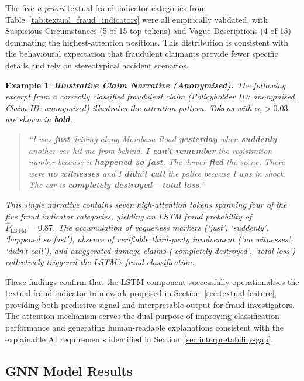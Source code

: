 \documentclass[12pt,a4paper,oneside]{report}
\newtheorem{example}{Example}[section]
\numberwithin{equation}{chapter}
\begin{document}
 The five \textit{a priori} textual fraud indicator categories from
Table~\ref{tab:textual_fraud_indicators} were all empirically validated, with Suspicious
Circumstances (5 of 15 top tokens) and Vague Descriptions (4 of 15) dominating the
highest-attention positions. This distribution is consistent with the behavioural expectation
that fraudulent claimants provide fewer specific details and rely on stereotypical accident
scenarios.

\begin{example}
\label{ex:fraud-narrative}
\textbf{Illustrative Claim Narrative (Anonymised).} The following excerpt from a correctly
classified fraudulent claim (\textit{Policyholder ID: anonymised, Claim ID: anonymised})
illustrates the attention pattern. Tokens with $\alpha_i > 0.03$ are shown in \textbf{bold}.

\begin{quote}
\small
``I was \textbf{just} driving along Mombasa Road \textbf{yesterday} when \textbf{suddenly}
another car hit me from behind. \textbf{I can't remember} the registration number because it
\textbf{happened so fast}. The driver \textbf{fled} the scene. There were \textbf{no witnesses}
and I \textbf{didn't call} the police because I was in shock. The car is
\textbf{completely destroyed} -- \textbf{total loss}.''
\end{quote}

 This single narrative contains seven high-attention tokens spanning four of the five
fraud indicator categories, yielding an LSTM fraud probability of $\hat{P}_{\text{LSTM}} = 0.87$.
The accumulation of vagueness markers (`just', `suddenly', `happened so fast'), absence of
verifiable third-party involvement (`no witnesses', `didn't call'), and exaggerated damage claims
(`completely destroyed', `total loss') collectively triggered the LSTM's fraud classification.
\end{example}

These findings confirm that the LSTM component successfully operationalises the textual
fraud indicator framework proposed in Section~\ref{sec:textual-feature}, providing both predictive
signal and interpretable output for fraud investigators. The attention mechanism serves the dual
purpose of improving classification performance and generating human-readable explanations
consistent with the explainable AI requirements identified in
Section~\ref{sec:interpretability-gap}.

\subsection{GNN Model Results}
\end{document}
